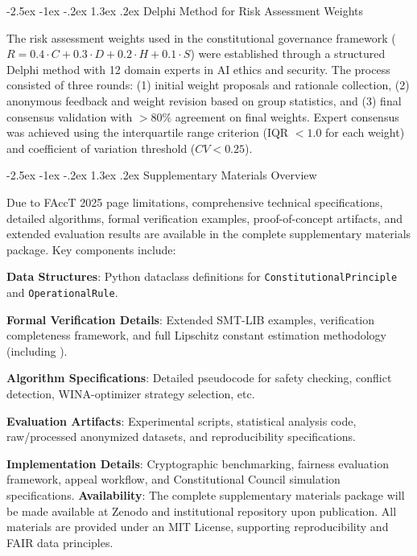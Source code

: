 \documentclass[manuscript,screen,9pt]{acmart}
\makeatletter
\renewcommand\section{\@startsection{section}{1}{\z@}%
  {-2.5ex \@plus -1ex \@minus -.2ex}%
  {1.3ex \@plus.2ex}%
  {\normalfont\Large\bfseries}}
\makeatother
\begin{document}
\section{Delphi Method for Risk Assessment Weights}
\label{app:delphi_method}

The risk assessment weights used in the constitutional governance framework ($R = 0.4 \cdot C + 0.3 \cdot D + 0.2 \cdot H + 0.1 \cdot S$) were established through a structured Delphi method with 12 domain experts in AI ethics and security. The process consisted of three rounds: (1) initial weight proposals and rationale collection, (2) anonymous feedback and weight revision based on group statistics, and (3) final consensus validation with $>80\%$ agreement on final weights. Expert consensus was achieved using the interquartile range criterion (IQR $< 1.0$ for each weight) and coefficient of variation threshold ($CV < 0.25$).

\section{Supplementary Materials Overview}
\label{app:supplementary}

Due to FAccT 2025 page limitations, comprehensive technical specifications, detailed algorithms, formal verification examples, proof-of-concept artifacts, and extended evaluation results are available in the complete supplementary materials package. Key components include:

\noindent\textbf{Data Structures}: Python dataclass definitions for \texttt{ConstitutionalPrinciple} and \texttt{OperationalRule}.

\noindent\textbf{Formal Verification Details}: Extended SMT-LIB examples, verification completeness framework, and full Lipschitz constant estimation methodology (including ).

\noindent\textbf{Algorithm Specifications}: Detailed pseudocode for safety checking, conflict detection, WINA-optimizer strategy selection, etc.

\noindent\textbf{Evaluation Artifacts}: Experimental scripts, statistical analysis code, raw/processed anonymized datasets, and reproducibility specifications.

\noindent\textbf{Implementation Details}: Cryptographic benchmarking, fairness evaluation framework, appeal workflow, and Constitutional Council simulation specifications.
\textbf{Availability}: The complete supplementary materials package will be made available at Zenodo and institutional repository upon publication. All materials are provided under an MIT License, supporting reproducibility and FAIR data principles.
\end{document}

